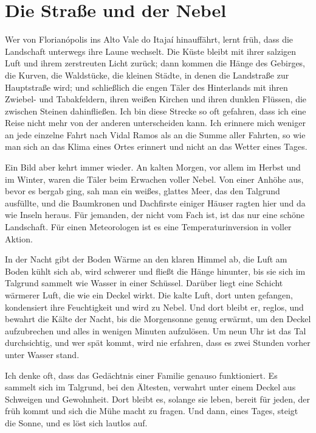 \documentclass[
  ngerman,
  11pt,
  openany]{book}
\begin{document}
\section{Die Straße und der Nebel}\label{die-strauxdfe-und-der-nebel}

Wer von Florianópolis ins Alto Vale do Itajaí hinauffährt, lernt früh,
dass die Landschaft unterwegs ihre Laune wechselt. Die Küste bleibt mit
ihrer salzigen Luft und ihrem zerstreuten Licht zurück; dann kommen die
Hänge des Gebirges, die Kurven, die Waldstücke, die kleinen Städte, in
denen die Landstraße zur Hauptstraße wird; und schließlich die engen
Täler des Hinterlands mit ihren Zwiebel- und Tabakfeldern, ihren weißen
Kirchen und ihren dunklen Flüssen, die zwischen Steinen dahinfließen.
Ich bin diese Strecke so oft gefahren, dass ich eine Reise nicht mehr
von der anderen unterscheiden kann. Ich erinnere mich weniger an jede
einzelne Fahrt nach Vidal Ramos als an die Summe aller Fahrten, so wie
man sich an das Klima eines Ortes erinnert und nicht an das Wetter eines
Tages.

Ein Bild aber kehrt immer wieder. An kalten Morgen, vor allem im Herbst
und im Winter, waren die Täler beim Erwachen voller Nebel. Von einer
Anhöhe aus, bevor es bergab ging, sah man ein weißes, glattes Meer, das
den Talgrund ausfüllte, und die Baumkronen und Dachfirste einiger Häuser
ragten hier und da wie Inseln heraus. Für jemanden, der nicht vom Fach
ist, ist das nur eine schöne Landschaft. Für einen Meteorologen ist es
eine Temperaturinversion in voller Aktion.

In der Nacht gibt der Boden Wärme an den klaren Himmel ab, die Luft am
Boden kühlt sich ab, wird schwerer und fließt die Hänge hinunter, bis
sie sich im Talgrund sammelt wie Wasser in einer Schüssel. Darüber liegt
eine Schicht wärmerer Luft, die wie ein Deckel wirkt. Die kalte Luft,
dort unten gefangen, kondensiert ihre Feuchtigkeit und wird zu Nebel.
Und dort bleibt er, reglos, und bewahrt die Kälte der Nacht, bis die
Morgensonne genug erwärmt, um den Deckel aufzubrechen und alles in
wenigen Minuten aufzulösen. Um neun Uhr ist das Tal durchsichtig, und
wer spät kommt, wird nie erfahren, dass es zwei Stunden vorher unter
Wasser stand.

Ich denke oft, dass das Gedächtnis einer Familie genauso funktioniert.
Es sammelt sich im Talgrund, bei den Ältesten, verwahrt unter einem
Deckel aus Schweigen und Gewohnheit. Dort bleibt es, solange sie leben,
bereit für jeden, der früh kommt und sich die Mühe macht zu fragen. Und
dann, eines Tages, steigt die Sonne, und es löst sich lautlos auf.
\end{document}
